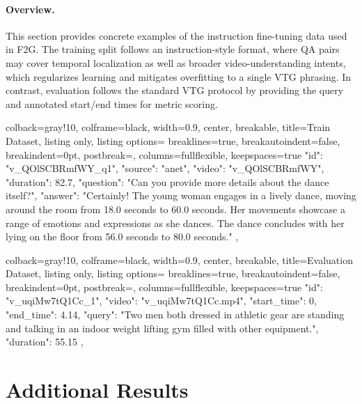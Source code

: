 \documentclass{article}
\theoremstyle{plain}
\theoremstyle{definition}
\theoremstyle{remark}
\begin{document}
\paragraph{Overview.}
This section provides concrete examples of the instruction fine-tuning data used in F2G.
The training split follows an instruction-style format, where QA pairs may cover temporal localization as well as broader video-understanding intents, which regularizes learning and mitigates overfitting to a single VTG phrasing. In contrast, evaluation follows the standard VTG protocol by providing the query and annotated start/end times for metric scoring.


\begin{tcblisting}{
  colback=gray!10,
  colframe=black,
  width=0.9\textwidth,
  center,
  breakable,
  title={Train Dataset},
  listing only,
  listing options={
    breaklines=true,
    breakautoindent=false,
    breakindent=0pt,
    postbreak=\mbox{},
    columns=fullflexible,
    keepspaces=true
  }
}
{
    "id": "v_QOlSCBRmfWY_q1",
    "source": "anet",
    "video": "v_QOlSCBRmfWY",
    "duration": 82.7,
    "question": "Can you provide more details about the dance itself?",
    "answer": "Certainly! The young woman engages in a lively dance, moving around the room from 18.0 seconds to 60.0 seconds. Her movements showcase a range of emotions and expressions as she dances. The dance concludes with her lying on the floor from 56.0 seconds to 80.0 seconds."
  },
\end{tcblisting}

\begin{tcblisting}{
  colback=gray!10,
  colframe=black,
  width=0.9\textwidth,
  center,
  breakable,
  title={Evaluation Dataset},
  listing only,
  listing options={
    breaklines=true,
    breakautoindent=false,
    breakindent=0pt,
    postbreak=\mbox{},
    columns=fullflexible,
    keepspaces=true
  }
}
{
        "id": "v_uqiMw7tQ1Cc_1",
        "video": "v_uqiMw7tQ1Cc.mp4",
        "start_time": 0,
        "end_time": 4.14,
        "query": "Two men both dressed in athletic gear are standing and talking in an indoor weight lifting gym filled with other equipment.",
        "duration": 55.15
    },
\end{tcblisting}


\section{Additional Results}
\label{app:additional_results}
\end{document}
